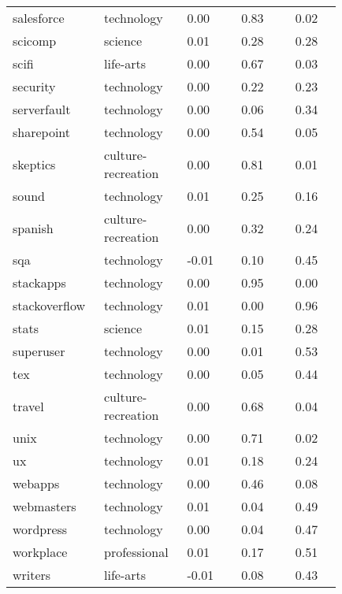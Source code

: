\begin{longtabu}{@{}
	p{0.2\linewidth}
	p{0.2\linewidth}
	P{0.15\linewidth}
	P{0.15\linewidth}
	P{0.13\linewidth}@{}}
salesforce       & technology         & 0.00        & 0.83          & 0.02           \\
scicomp          & science            & 0.01        & 0.28          & 0.28           \\
scifi            & life-arts          & 0.00        & 0.67          & 0.03           \\
security         & technology         & 0.00        & 0.22          & 0.23           \\
serverfault      & technology         & 0.00        & 0.06          & 0.34           \\
sharepoint       & technology         & 0.00        & 0.54          & 0.05           \\
skeptics         & culture-recreation & 0.00        & 0.81          & 0.01           \\
sound            & technology         & 0.01        & 0.25          & 0.16           \\
spanish          & culture-recreation & 0.00        & 0.32          & 0.24           \\
sqa              & technology         & -0.01       & 0.10          & 0.45           \\
stackapps        & technology         & 0.00        & 0.95          & 0.00           \\
stackoverflow    & technology         & 0.01        & 0.00          & 0.96           \\
stats            & science            & 0.01        & 0.15          & 0.28           \\
superuser        & technology         & 0.00        & 0.01          & 0.53           \\
tex              & technology         & 0.00        & 0.05          & 0.44           \\
travel           & culture-recreation & 0.00        & 0.68          & 0.04           \\
unix             & technology         & 0.00        & 0.71          & 0.02           \\
ux               & technology         & 0.01        & 0.18          & 0.24           \\
webapps          & technology         & 0.00        & 0.46          & 0.08           \\
webmasters       & technology         & 0.01        & 0.04          & 0.49           \\
wordpress        & technology         & 0.00        & 0.04          & 0.47           \\
workplace        & professional       & 0.01        & 0.17          & 0.51           \\
writers          & life-arts          & -0.01       & 0.08          & 0.43           \\ \bottomrule


\end{longtabu}
